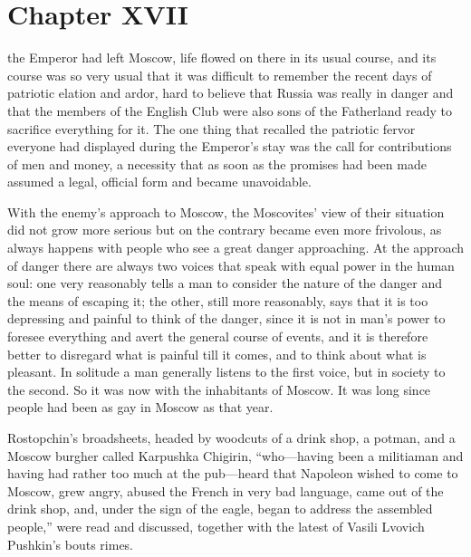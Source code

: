 \chapter*{Chapter XVII} \ifaudio {}
\fi

 the Emperor had left Moscow, life flowed on there in its
usual course, and its course was so very usual that it was
difficult to remember the recent days of patriotic elation and
ardor, hard to believe that Russia was really in danger and that
the members of the English Club were also sons of the Fatherland
ready to sacrifice everything for it. The one thing that recalled
the patriotic fervor everyone had displayed during the Emperor's
stay was the call for contributions of men and money, a necessity
that as soon as the promises had been made assumed a legal,
official form and became unavoidable.

With the enemy's approach to Moscow, the Moscovites' view of
their situation did not grow more serious but on the contrary
became even more frivolous, as always happens with people who see
a great danger approaching. At the approach of danger there are
always two voices that speak with equal power in the human soul:
one very reasonably tells a man to consider the nature of the
danger and the means of escaping it; the other, still more
reasonably, says that it is too depressing and painful to think
of the danger, since it is not in man's power to foresee
everything and avert the general course of events, and it is
therefore better to disregard what is painful till it comes, and
to think about what is pleasant. In solitude a man generally
listens to the first voice, but in society to the second. So it
was now with the inhabitants of Moscow. It was long since people
had been as gay in Moscow as that year.

Rostopchin's broadsheets, headed by woodcuts of a drink shop, a
potman, and a Moscow burgher called Karpushka Chigirin,
``who---having been a militiaman and having had rather too much
at the pub---heard that Napoleon wished to come to Moscow, grew
angry, abused the French in very bad language, came out of the
drink shop, and, under the sign of the eagle, began to address
the assembled people,'' were read and discussed, together with
the latest of Vasili Lvovich Pushkin's bouts rimes.

